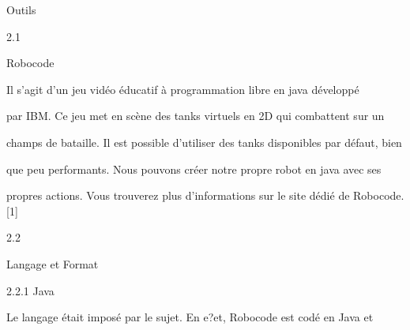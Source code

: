 \documentclass[a4paper,portrait,12pt]{article}
\begin{document}
\begin{flushleft}
Outils
\end{flushleft}





2.1





\begin{flushleft}
Robocode
\end{flushleft}





\begin{flushleft}
Il s'agit d'un jeu vid\'{e}o \'{e}ducatif \`{a} programmation libre en java d\'{e}velopp\'{e}
\end{flushleft}


\begin{flushleft}
par IBM. Ce jeu met en sc\`{e}ne des tanks virtuels en 2D qui combattent sur un
\end{flushleft}


\begin{flushleft}
champs de bataille. Il est possible d'utiliser des tanks disponibles par d\'{e}faut, bien
\end{flushleft}


\begin{flushleft}
que peu performants. Nous pouvons cr\'{e}er notre propre robot en java avec ses
\end{flushleft}


\begin{flushleft}
propres actions. Vous trouverez plus d'informations sur le site d\'{e}di\'{e} de Robocode. [1]
\end{flushleft}





2.2





\begin{flushleft}
Langage et Format
\end{flushleft}





\begin{flushleft}
2.2.1 Java
\end{flushleft}


\begin{flushleft}
Le langage \'{e}tait impos\'{e} par le sujet. En e?et, Robocode est cod\'{e} en Java et
\end{flushleft}
\end{document}
